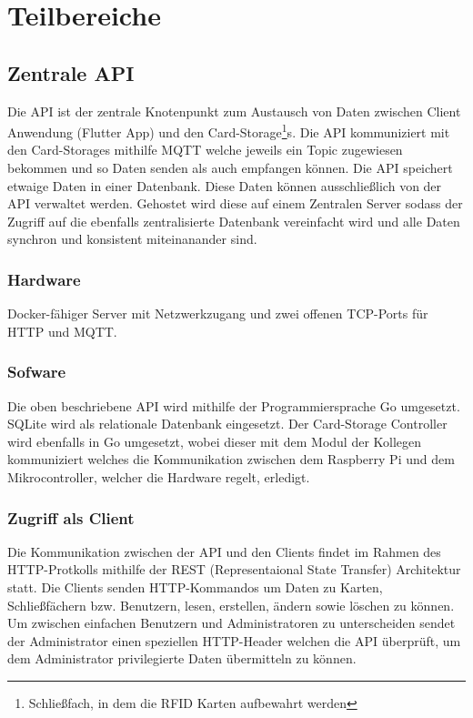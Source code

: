 \section{Teilbereiche}
\subsection{Zentrale API} \label{sec-central-api}
Die API ist der zentrale Knotenpunkt zum Austausch von Daten zwischen Client Anwendung (Flutter App) und den Card-Storage\footnote{Schließfach, in dem die RFID Karten aufbewahrt werden}s. Die API kommuniziert mit den Card-Storages mithilfe MQTT welche jeweils ein Topic zugewiesen bekommen und so Daten senden als auch empfangen können. Die API speichert etwaige Daten in einer Datenbank. Diese Daten können ausschließlich von der API verwaltet werden. Gehostet wird diese auf einem Zentralen Server sodass der Zugriff auf die ebenfalls zentralisierte Datenbank vereinfacht wird und alle Daten synchron und konsistent miteinanander sind.

\subsubsection{Hardware}
Docker-fähiger Server mit Netzwerkzugang und zwei offenen TCP-Ports für HTTP und MQTT.

\subsubsection{Sofware}
Die oben beschriebene API wird mithilfe der Programmiersprache Go umgesetzt. SQLite wird als relationale Datenbank eingesetzt. Der Card-Storage Controller wird ebenfalls in Go umgesetzt, wobei dieser mit dem Modul der Kollegen kommuniziert welches die Kommunikation zwischen dem Raspberry Pi und dem Mikrocontroller, welcher die Hardware regelt, erledigt.

\subsubsection{Zugriff als Client}
Die Kommunikation zwischen der API und den Clients findet im Rahmen des HTTP-Protkolls mithilfe der REST (Representaional State Transfer) Architektur statt. Die Clients senden HTTP-Kommandos um Daten zu Karten, Schließfächern bzw. Benutzern, lesen, erstellen, ändern sowie löschen zu können. Um zwischen einfachen Benutzern und Administratoren zu unterscheiden sendet der Administrator einen speziellen HTTP-Header welchen die API überprüft, um dem Administrator privilegierte Daten übermitteln zu können.   

